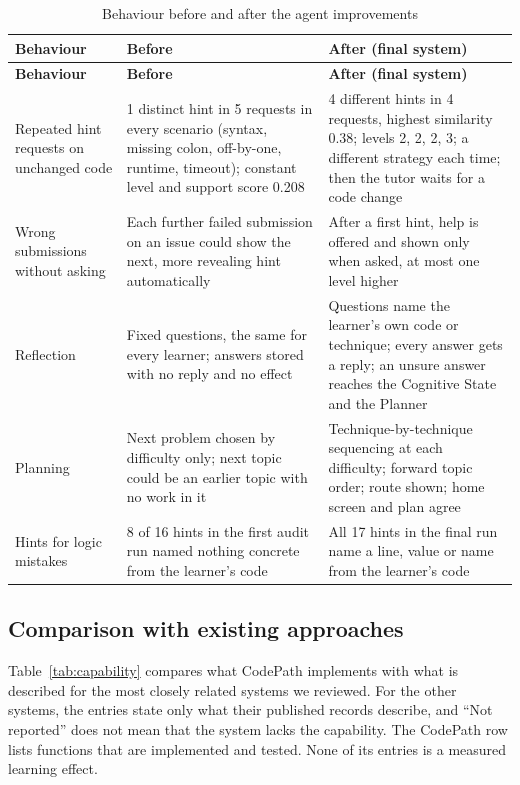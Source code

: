 \begingroup\small
\setlength{\tabcolsep}{4pt}\renewcommand{\arraystretch}{1.15}
\begin{longtable}{|R{3.7cm}|R{4.8cm}|R{5.1cm}|}
\caption{Behaviour before and after the agent improvements}\label{tab:before-after}\\\hline
\textbf{Behaviour} & \textbf{Before} & \textbf{After (final system)}\\\hline\endfirsthead
\hline\textbf{Behaviour} & \textbf{Before} & \textbf{After (final system)}\\\hline\endhead
Repeated hint requests on unchanged code & 1 distinct hint in 5 requests in every scenario (syntax, missing colon, off-by-one, runtime, timeout); constant level and support score 0.208 & 4 different hints in 4 requests, highest similarity 0.38; levels 2, 2, 2, 3; a different strategy each time; then the tutor waits for a code change\\\hline
Wrong submissions without asking & Each further failed submission on an issue could show the next, more revealing hint automatically & After a first hint, help is offered and shown only when asked, at most one level higher\\\hline
Reflection & Fixed questions, the same for every learner; answers stored with no reply and no effect & Questions name the learner's own code or technique; every answer gets a reply; an unsure answer reaches the Cognitive State and the Planner\\\hline
Planning & Next problem chosen by difficulty only; next topic could be an earlier topic with no work in it & Technique-by-technique sequencing at each difficulty; forward topic order; route shown; home screen and plan agree\\\hline
Hints for logic mistakes & 8 of 16 hints in the first audit run named nothing concrete from the learner's code & All 17 hints in the final run name a line, value or name from the learner's code\\\hline
\end{longtable}
\endgroup

\subsection{Comparison with existing approaches}
Table~\ref{tab:capability} compares what CodePath implements with what is described for the most closely related systems we reviewed. For the other systems, the entries state only what their published records describe, and ``Not reported'' does not mean that the system lacks the capability. The CodePath row lists functions that are implemented and tested. None of its entries is a measured learning effect.

